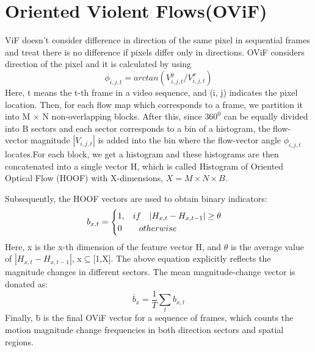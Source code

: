 \section{Oriented Violent Flows(OViF)}
ViF doesn't consider difference in direction of the same pixel in sequential frames and treat there is no difference if pixels differ only in directions. OViF considers direction of the pixel and it is calculated by using
\begin{equation}
\phi_{i,j,t} = arctan(V^y_{i,j,t}/V^x_{i,j,t}) 
\end{equation}
Here, t means the t-th frame in a video sequence, and (i, j) indicates the pixel location. Then, for each flow map which corresponds to a frame, we partition it into M × N non-overlapping blocks. After this, since $360^0$ can be equally divided into B sectors and each sector corresponds to a bin of a histogram, the flow-vector magnitude $|V_{i,j,t}|$ is added into the bin where the flow-vector angle $\phi_{i,j,t}$ locates.For each block, we get a histogram and these histograms are then concatenated into a single vector H, which is called Histogram of Oriented Optical Flow (HOOF) with X-dimensions, $X = M \times N \times B$.
\par
Subsequently, the HOOF vectors are used to obtain binary indicators:
\begin{equation}
b_{x,t} = \begin{cases}
\text {1,\quad}if\quad |H_{x,t} - H_{x,t-1}| \geq \theta\\
\text {0\quad}   \quad otherwise
\end{cases}
\end{equation}
Here, x is the x-th dimension of the feature vector H, and $\theta$ is the average value of $|H_{x,t}-H_{x,t-1}|$, x$\subseteq$[1,X]. The above equation explicitly reflects the magnitude changes in different sectors. The mean magnitude-change vector is donated as:
\begin{equation}
\overline b_{x} = \frac{1}{T}\sum_{t}b_{x,t}
\end{equation}
Finally, b̄ is the final OViF vector for a sequence of frames, which counts the motion magnitude change frequencies in both direction sectors and spatial regions.
